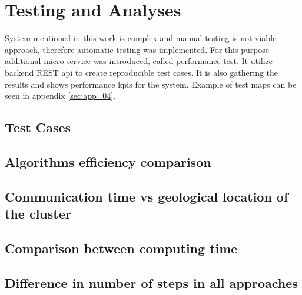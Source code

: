 \chapter{Testing and Analyses}
System mentioned in this work is complex and manual testing is not viable approach, therefore automatic testing was implemented. For this purpose additional micro-service was introduced, called performance-test. It utilize backend REST api to create reproducible test cases. It is also gathering the results and shows performance kpis for the system. Example of test maps can be seen in appendix \ref{sec:app_04}.

\section{Test Cases}


\section{Algorithms efficiency comparison}


\section{Communication time vs geological location of the cluster}


\section{Comparison between computing time}


\section{Difference in number of steps in all approaches}


